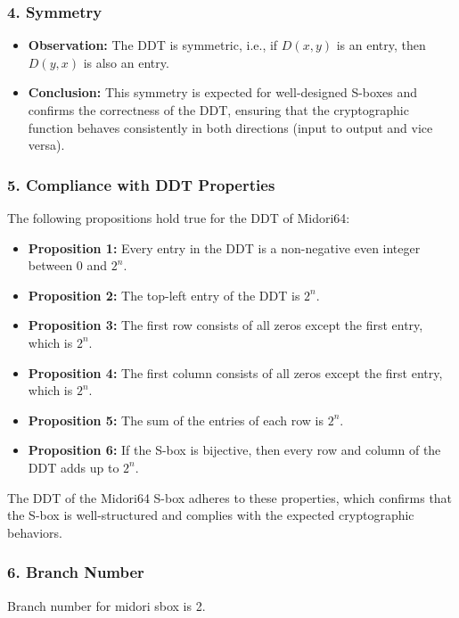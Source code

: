 \subsubsection*{4. Symmetry}
\begin{itemize}
	\item
	      \textbf{Observation:} The DDT is symmetric, i.e., if \( D(x, y) \) is an entry,
	      then \( D(y, x) \) is also an entry.
	\item
	      \textbf{Conclusion:} This symmetry is expected for well-designed S-boxes and
	      confirms the correctness of the DDT, ensuring that the cryptographic function
	      behaves consistently in both directions (input to output and vice versa).
\end{itemize}

\subsubsection*{5. Compliance with DDT Properties}
The following propositions hold true for the DDT of Midori64:
\begin{itemize}
	\item \textbf{Proposition 1:} Every entry in the DDT is a non-negative even
	      integer between 0 and \( 2^n \).
	\item \textbf{Proposition 2:} The top-left entry of the DDT is \( 2^n \).
	\item \textbf{Proposition 3:} The first row consists of all zeros except the
	      first entry, which is \( 2^n \).
	\item \textbf{Proposition 4:} The first column consists of all zeros except
	      the first entry, which is \( 2^n \).
	\item \textbf{Proposition 5:} The sum of the entries of each row is \( 2^n \).
	\item \textbf{Proposition 6:} If the S-box is bijective, then every row and
	      column of the DDT adds up to \( 2^n \).
\end{itemize}

The DDT of the Midori64 S-box adheres to these properties, which confirms that
the S-box is well-structured and complies with the expected cryptographic
behaviors.

\subsubsection*{6. Branch Number}
   Branch number for midori sbox is 2.

